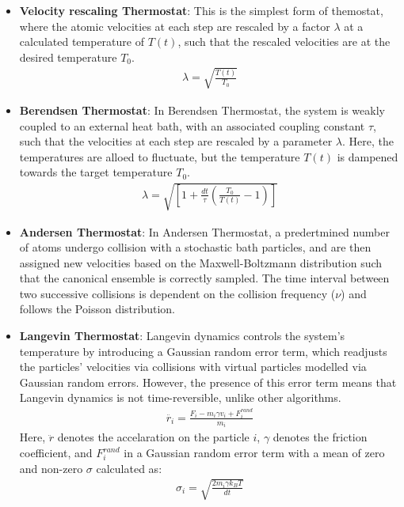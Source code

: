     \begin{itemize}
        \item \textbf{Velocity rescaling Thermostat}\supercite{woodcock_isothermal_1971}: This is the simplest form of themostat, where the atomic velocities at each step are rescaled by a factor $\lambda$ at a calculated temperature of $T(t)$, such that the rescaled velocities are at the desired temperature $T_0$.
        \begin{align*}
            \lambda = \sqrt{\frac{T(t)}{T_0}}
        \end{align*}

        \item \textbf{Berendsen Thermostat}\supercite{berendsen_molecular_1984}: In Berendsen Thermostat, the system is weakly coupled to an external heat bath, with an associated coupling constant $\tau$, such that the velocities at each step are rescaled by a parameter $\lambda$. Here, the temperatures are alloed to fluctuate, but the temperature $T(t)$ is dampened towards the target temperature $T_0$.
        \begin{align*}
            \lambda = \sqrt{\left[1 + \frac{dt}{\tau}\left(\frac{T_0}{T(t)}-1\right)\right]}
        \end{align*}

        \item \textbf{Andersen Thermostat}\supercite{andersen_molecular_1980}: In Andersen Thermostat, a predertmined number of atoms undergo collision with a stochastic bath particles, and are then assigned new velocities based on the Maxwell-Boltzmann distribution such that the canonical ensemble is correctly sampled. The time interval between two successive collisions is dependent on the collision frequency ($\nu$) and follows the Poisson distribution.

        \item \textbf{Langevin Thermostat}\supercite{schneider_molecular-dynamics_1978}: Langevin dynamics controls the system's temperature by introducing a Gaussian random error term, which readjusts the particles' velocities via collisions with virtual particles modelled via Gaussian random errors. However, the presence of this error term means that Langevin dynamics is not time-reversible, unlike other algorithms.
        \begin{align*}
            \ddot{r_i} = \frac{F_i - m_i\gamma v_i + F^{rand}_i}{m_i}
        \end{align*}
        Here, $\ddot{r}$ denotes the accelaration on the particle $i$, $\gamma$ denotes the friction coefficient, and $F^{rand}_i$ in a Gaussian random error term with a mean of zero and non-zero $\sigma$ calculated as:
        \begin{align*}
            \sigma_i = \sqrt{\frac{2m_i\gamma k_B T}{dt}}
        \end{align*}


\end{itemize}
